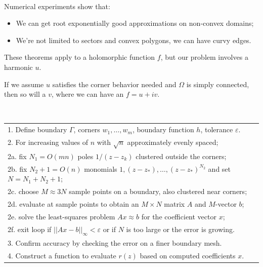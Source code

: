 \documentclass{seminar}
\begin{document}
\begin{slide} %
{} \small \\

Numerical experiments show that:
\begin{itemize}
	\item We can get root exponentially good approximations on non-convex domains;
	\item We're not limited to sectors and convex polygons, we can have curvy edges.
\end{itemize}
These theorems apply to a holomorphic function $f$, but our problem involves a harmonic $u$. 

If we assume $u$ satisfies the corner behavior needed and $\Omega$ is simply connected, then so will a $v$, where we can have an $f=u+iv$.
\end{slide} %




\begin{slide} %
{} \small \\
\begin{table}[h]
	\begin{tabular}{l}
		1. Define boundary $\Gamma$, corners $w_1,\ldots, w_m$, boundary function $h$, tolerance $\varepsilon$.	\\
		2. For increasing values of $n$ with $\sqrt{n}$	approximately evenly spaced; \\
		\: 2a. fix $N_1=O(mn)$ poles $1/(z-z_k)$ clustered outside the corners; \\
		\: 2b. fix $N_2+1=O(n)$ monomials $1,(z-z_*),\ldots,(z-z_*)^{N_2}$ and set $N=N_1+N_2+1$; \\
		\: 2c. choose $M\approx 3N$ sample points on a boundary, also clustered near corners; \\
		\: 2d. evaluate at sample points to obtain an $M\times N$ matrix $A$ and $M$-vector $b$; \\
		\: 2e. solve the least-squares problem $Ax\approx b$ for the coefficient vector $x$; \\
		\: 2f. exit loop if $||Ax-b||_\infty < \varepsilon$ or if $N$ is too large or the error is growing. \\
		3. Confirm accuracy by checking the error on a finer boundary mesh. \\
		4. Construct a function to evaluate $r(z)$ based on computed coefficients $x$.
	\end{tabular}
\end{table}
\end{slide} %
\end{document}
